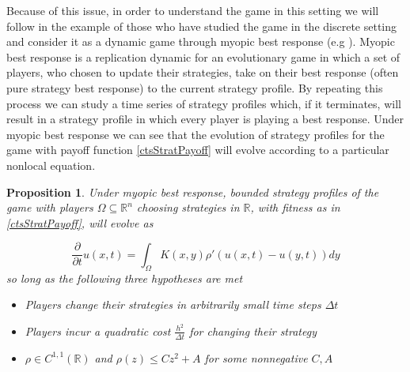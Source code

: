 \documentclass[aps,
preprint,
groupedaddress,
showkeys,
amsmath]{revtex4-2}
\newtheorem{proposition}{Proposition}
\begin{document}
    Because of this issue, in order to understand the game in this setting we will follow in the example of those who have studied the game in the discrete setting and consider it as a dynamic game through myopic best response (e.g \cite{Ellison1993,Raducha2022}). Myopic best response is a replication dynamic for an evolutionary game in which a set of players, who chosen to update their strategies, take on their best response (often pure strategy best response) to the current strategy profile.  By repeating this process we can study a time series of strategy profiles which, if it terminates, will result in a strategy profile in which every player is playing a best response. Under myopic best response we can see that the evolution of strategy profiles for the game with payoff function \eqref{ctsStratPayoff} will evolve according to a particular nonlocal equation.

    \begin{proposition}\label{PROP:ModelWellFounded}
        Under myopic best response, bounded strategy profiles of the game with players $\Omega\subseteq \mathbb{R}^n$ choosing strategies in $\mathbb{R}$, with fitness as in \eqref{ctsStratPayoff}, will evolve as
       
       \[\frac{\partial}{\partial t}u(x,t)=\int_{\Omega}K(x,y)\rho'(u(x,t)-u(y,t))dy\]
        so long as the following three hypotheses are met
        \begin{itemize}
            \item[(H1)] Players change their strategies in arbitrarily small time steps $\Delta t$
            \item[(H2)] Players incur a quadratic cost $\frac{h^2}{\Delta t}$ for changing their strategy
            \item[(H3)] $\rho\in C^{1,1}(\mathbb{R})$ and $\rho(z)\leq Cz^2+A$ for some nonnegative $C,A$
        \end{itemize}
    \end{proposition}
\end{document}
